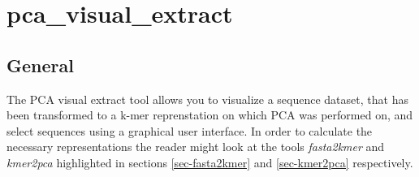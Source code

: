 \section{pca\_visual\_extract} \label{sec-pcavisual}

\subsection{General}

The PCA visual extract tool allows you to visualize a sequence dataset,
that has been transformed to a k-mer reprenstation on which PCA was performed
on, and select sequences using a graphical user interface. In order to
calculate the necessary representations the reader might look at the tools
\emph{fasta2kmer} and \emph{kmer2pca} highlighted in sections
\ref{sec-fasta2kmer} and \ref{sec-kmer2pca} respectively.

